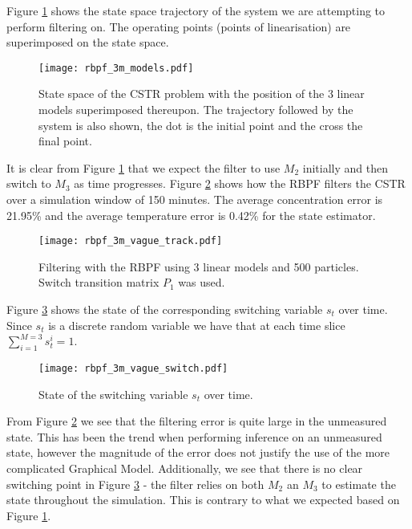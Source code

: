 Figure \ref{fig_3m_models} shows the state space trajectory of the system we are attempting to perform filtering on. The operating points (points of linearisation) are superimposed on the state space.
\begin{figure}[H] 
\centering
\texttt{[image: rbpf\_3m\_models.pdf]}
\caption{State space of the CSTR problem with the position of the 3 linear models superimposed thereupon. The trajectory followed by the system is also shown, the dot is the initial point and the cross the final point.}
\label{fig_3m_models}
\end{figure}
It is clear from Figure \ref{fig_3m_models} that we expect the filter to use $M_2$ initially and then switch to $M_3$ as time progresses. Figure \ref{fig_3m_vage_track} shows how the RBPF filters the CSTR over a simulation window of 150 minutes. The average concentration error is 21.95\% and the average temperature error is 0.42\% for the state estimator.
\begin{figure}[H] 
\centering
\texttt{[image: rbpf\_3m\_vague\_track.pdf]}
\caption{Filtering with the RBPF using 3 linear models and 500 particles. Switch transition matrix $P_1$ was used.}
\label{fig_3m_vage_track}
\end{figure}
Figure \ref{fig_3m_vage_switch} shows the state of the corresponding switching variable $s_t$ over time. Since $s_t$ is a discrete random variable we have that at each time slice $\sum_{i=1}^{M=3} s_t^i = 1$.
\begin{figure}[H] 
\centering
\texttt{[image: rbpf\_3m\_vague\_switch.pdf]}
\caption{State of the switching variable $s_t$ over time.}
\label{fig_3m_vage_switch}
\end{figure}
From Figure \ref{fig_3m_vage_track} we see that the filtering error is quite large in the unmeasured state. This has been the trend when performing inference on an unmeasured state, however the magnitude of the error does not justify the use of the more complicated Graphical Model. Additionally, we see that there is no clear switching point in Figure \ref{fig_3m_vage_switch} - the filter relies on both $M_2$ an $M_3$ to estimate the state throughout the simulation. This is contrary to what we expected based on Figure \ref{fig_3m_models}.

